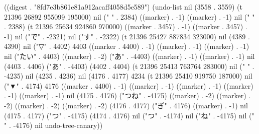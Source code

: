 
((digest . "8fd7e3b861e81a912acaff4058d5e589") (undo-list nil (3558 . 3559) (t 21396 26892 955099 195000) nil ("
" . 2384) ((marker) . -1) ((marker) . -1) nil ("
" . 2388) (t 21396 25634 924860 970000) ((marker . 3457) . -1) ((marker . 3457) . -1) nil ("で" . -2321) nil ("す" . -2322) (t 21396 25427 887834 323000) nil (4389 . 4390) nil ("▽" . 4402) 4403 ((marker . 4400) . -1) ((marker) . -1) ((marker) . -1) nil ("たい" . 4403) ((marker) . -2) ("あ" . -4403) ((marker) . -1) ((marker) . -1) nil (4403 . 4406) ("あ" . -4403) (4402 . 4404) (t 21396 25413 763764 283000) nil ("
" . -4235) nil (4235 . 4236) nil (4176 . 4177) 4234 (t 21396 25410 919750 187000) nil ("▼" . 4174) 4176 ((marker . 4400) . -1) ((marker) . -1) ((marker) . -1) ((marker) . -1) ((marker) . -1) nil (4175 . 4176) ("つね" . -4175) ((marker) . -2) ((marker) . -2) ((marker) . -2) ((marker) . -2) (4176 . 4177) ("ぎ" . 4176) ((marker) . -1) nil (4175 . 4177) ("つ" . -4175) (4174 . 4176) nil ("つ" . -4174) nil ("ね" . -4175) nil ("
" . -4176) nil undo-tree-canary))
